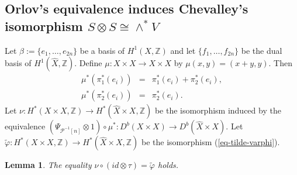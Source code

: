 \documentclass[12pt]{amsart}
\numberwithin{equation}{subsection}
\theoremstyle{plain}
\newtheorem{lem}[thm]{Lemma}
\theoremstyle{definition}
\newcommand{\ZZ}{{\mathbb Z}}
\renewcommand{\P}{{\mathcal P}}
\begin{document}
% 
\subsection{Orlov's equivalence induces Chevalley's isomorphism $S\otimes S\cong \wedge^*V$}
\label{sec-Orlov-equal-Chevalley}
\label{sec-categorification}
Let $\beta:=\{e_1, \dots, e_{2n}\}$ be a basis of $H^1(X,\ZZ)$ and let $\{f_1, \dots, f_{2n}\}$ be the dual basis of $H^1(\hat{X},\ZZ)$.
Define $\mu:X\times X\rightarrow X\times X$ by $\mu(x,y)=(x+y,y)$. 
Then
\begin{eqnarray*}
\mu^*(\pi_1^*(e_i))&=&\pi_1^*(e_i)+\pi_2^*(e_i),
\\
\mu^*(\pi_2^*(e_i))&=&\pi_2^*(e_i).
\end{eqnarray*}
Let $\nu:H^*(X\times X,\ZZ)\rightarrow H^*(\hat{X}\times X,\ZZ)$ be the isomorphism induced by the equivalence
$(\Psi_{\P^{-1}[n]}\otimes 1)\circ\mu^*:D^b(X\times X)\rightarrow D^b(\hat{X}\times X)$.
Let $\tilde{\varphi}:H^*(X\times X,\ZZ)\rightarrow H^*(\hat{X}\times X,\ZZ)$ be the isomorphism (\ref{eq-tilde-varphi}).
\begin{lem}
\label{lemma-nu-equal-tilde-varphi}
The equality $\nu\circ(id\otimes \tau)=\tilde{\varphi}$ holds.
\end{lem}
\end{document}
